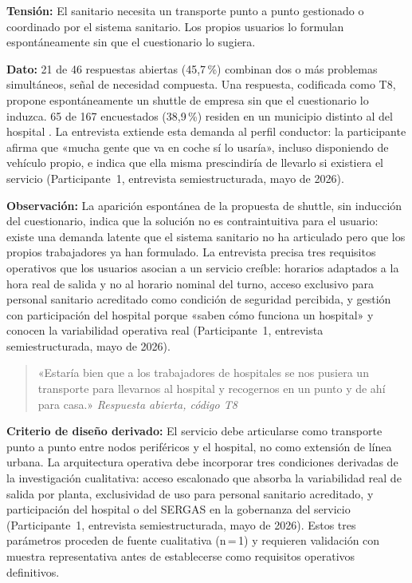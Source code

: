 \textbf{Tensión:} El sanitario necesita un transporte
punto a punto gestionado o coordinado por el sistema sanitario.
Los propios usuarios lo formulan espontáneamente sin que el
cuestionario lo sugiera.

\textbf{Dato:} 21 de 46 respuestas abiertas (45{,}7\,\%)
combinan dos o más problemas simultáneos, señal de necesidad
compuesta. Una respuesta, codificada como T8, propone
espontáneamente un shuttle de empresa sin que el cuestionario
lo induzca. 65 de 167 encuestados (38{,}9\,\%) residen en
un municipio distinto al del hospital
\parencite{LouridoRegueira2026}. La entrevista extiende esta
demanda al perfil conductor: la participante afirma que «mucha
gente que va en coche sí lo usaría», incluso disponiendo de
vehículo propio, e indica que ella misma prescindiría de llevarlo
si existiera el servicio (Participante~1, entrevista
semiestructurada, mayo de 2026).

\textbf{Observación:} La aparición espontánea de la propuesta
de shuttle, sin inducción del cuestionario, indica que la
solución no es contraintuitiva para el usuario: existe una
demanda latente que el sistema sanitario no ha articulado pero
que los propios trabajadores ya han formulado. La entrevista
precisa tres requisitos operativos que los usuarios asocian a
un servicio creíble: horarios adaptados a la hora real de salida
y no al horario nominal del turno, acceso exclusivo para
personal sanitario acreditado como condición de seguridad
percibida, y gestión con participación del hospital porque
«saben cómo funciona un hospital» y conocen la variabilidad
operativa real (Participante~1, entrevista semiestructurada,
mayo de 2026).

\begin{quote}
«Estaría bien que a los trabajadores de hospitales se nos
pusiera un transporte para llevarnos al hospital y recogernos
en un punto y de ahí para casa.»
\hfill\textit{Respuesta abierta, código T8 \parencite{LouridoRegueira2026}}
\end{quote}

\textbf{Criterio de diseño derivado:} El servicio debe
articularse como transporte punto a punto entre nodos
periféricos y el hospital, no como extensión de línea urbana.
La arquitectura operativa debe incorporar tres condiciones
derivadas de la investigación cualitativa: acceso escalonado
que absorba la variabilidad real de salida por planta,
exclusividad de uso para personal sanitario acreditado, y
participación del hospital o del \acs{SERGAS} en la gobernanza
del servicio (Participante~1, entrevista semiestructurada,
mayo de 2026). Estos tres parámetros proceden de fuente
cualitativa (n\,=\,1) y requieren validación con muestra
representativa antes de establecerse como requisitos operativos
definitivos.

